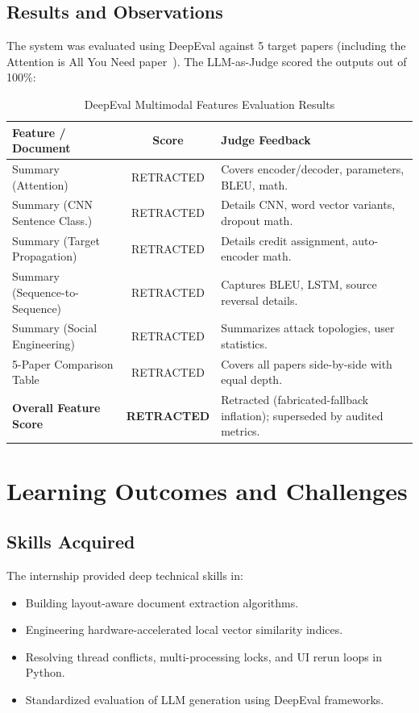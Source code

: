 \documentclass[12pt]{report}
\begin{document}
{\section{Results and Observations}
The system was evaluated using DeepEval against 5 target papers (including the Attention is All You Need paper~\cite{vaswani2017attention}). The LLM-as-Judge scored the outputs out of 100\%:

\begin{table}[h!]
\centering
\begin{tabular}{|l|c|l|}
\hline
\textbf{Feature / Document} & \textbf{Score} & \textbf{Judge Feedback} \\
\hline
Summary (Attention) & RETRACTED & Covers encoder/decoder, parameters, BLEU, math. \\
Summary (CNN Sentence Class.) & RETRACTED & Details CNN, word vector variants, dropout math. \\
Summary (Target Propagation) & RETRACTED & Details credit assignment, auto-encoder math. \\
Summary (Sequence-to-Sequence) & RETRACTED & Captures BLEU, LSTM, source reversal details. \\
Summary (Social Engineering) & RETRACTED & Summarizes attack topologies, user statistics. \\
5-Paper Comparison Table & RETRACTED & Covers all papers side-by-side with equal depth. \\
\hline
\textbf{Overall Feature Score} & \textbf{RETRACTED} & Retracted (fabricated-fallback inflation); superseded by audited metrics. \\
\hline
\end{tabular}
\caption{DeepEval Multimodal Features Evaluation Results}
\label{tab:results}
\end{table}

\chapter{Learning Outcomes and Challenges}
\section{Skills Acquired}
The internship provided deep technical skills in:
\begin{itemize}
    \item Building layout-aware document extraction algorithms.
    \item Engineering hardware-accelerated local vector similarity indices.
    \item Resolving thread conflicts, multi-processing locks, and UI rerun loops in Python.
    \item Standardized evaluation of LLM generation using DeepEval frameworks.
\end{itemize}

}
\end{document}
